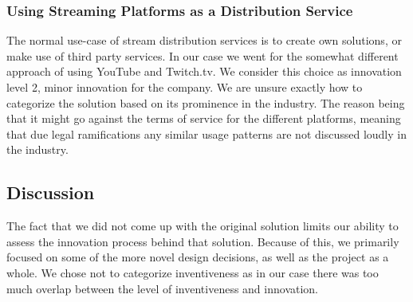 \subsubsection{Using Streaming Platforms as a Distribution Service}
The normal use-case of stream distribution services is to create own solutions, or make use of third party services. In our case we went for the somewhat different approach of using YouTube and Twitch.tv. We consider this choice as innovation level 2, minor innovation for the company\cite{nrcs}. We are unsure exactly how to categorize the solution based on its prominence in the industry. The reason being that it might go against the terms of service for the different platforms, meaning that due legal ramifications any similar usage patterns are not discussed loudly in the industry. 




\subsection{Discussion}
The fact that we did not come up with the original solution limits our ability to assess the innovation process behind that solution. Because of this, we primarily focused on some of the more novel design decisions, as well as the project as a whole. We chose not to categorize inventiveness as in our case there was too much overlap between the level of inventiveness and innovation.
